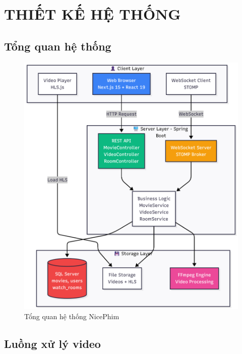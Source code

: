 \newpage
\section{\textbf{THIẾT KẾ HỆ THỐNG}}

\subsection{Tổng quan hệ thống}

\begin{figure}[H]
	\centering
	\includegraphics[width=1\textwidth]{image/mermaid/tongquahethong.png}
	\caption{Tổng quan hệ thống NicePhim}
	\label{fig:tongquahethong}
\end{figure}

\subsection{Luồng xử lý video}


